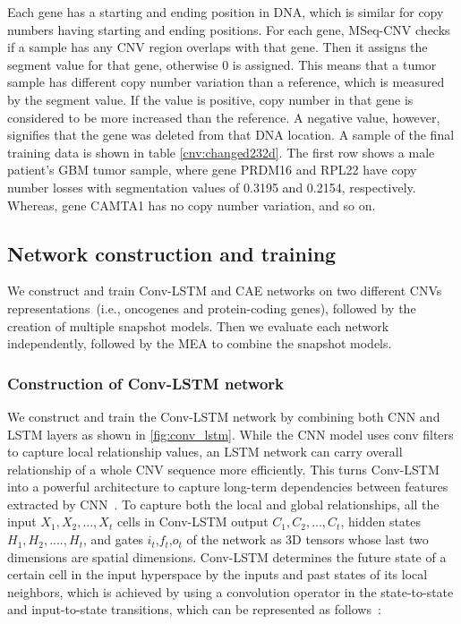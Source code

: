 \hspace*{3.5mm} Each gene has a starting and ending position in DNA, which is similar for copy numbers having starting and ending positions. For each gene, MSeq-CNV checks if a sample has any CNV region overlaps with that gene. Then it assigns the segment value for that gene, otherwise 0 is assigned. This means that a tumor sample has different copy number variation than a reference, which is measured by the segment value. If the value is positive, copy number in that gene is considered to be more increased than the reference. A negative value, however, signifies that the gene was deleted from that DNA location. A sample of the final training data is shown in table \ref{cnv:changed232d}. The first row shows a male patient's GBM tumor sample, where gene PRDM16 and RPL22 have copy number losses with segmentation values of 0.3195 and 0.2154, respectively. Whereas, gene CAMTA1 has no copy number variation, and so on. %

\subsection{Network construction and training}
\label{nc}
We construct and train Conv-LSTM and CAE networks on two different CNVs representations~(i.e., oncogenes and protein-coding genes), followed by the creation of multiple snapshot models. Then we evaluate each network independently, followed by the MEA to combine the snapshot models. 

\subsubsection{Construction of Conv-LSTM network }
We construct and train the Conv-LSTM network by combining both CNN and LSTM layers as shown in \cref{fig:conv_lstm}. While the CNN model uses conv filters to capture local relationship values, an LSTM network can carry overall relationship of a whole CNV sequence more efficiently. This turns Conv-LSTM into a powerful architecture to capture long-term dependencies between features extracted by CNN~\cite{karim2019drug}. To capture both the local and global relationships, all the input ${X}_{1},{X}_{2},...,{X}_{t}$ cells in Conv-LSTM output ${C}_{1},{C}_{2},...,{C}_{t}$, hidden states ${H}_{1},{H}_{2},....,{H}_{t}$, and gates $i_t$,$f_t$,$o_t$ of the network as 3D tensors whose last two dimensions are spatial dimensions. %
Conv-LSTM determines the future state of a certain cell in the input hyperspace by the inputs and past states of its local neighbors, which is achieved by using a convolution operator in the state-to-state and input-to-state transitions, which can be represented as follows~\cite{Conv_LSTM1,karimACCA2019}:


